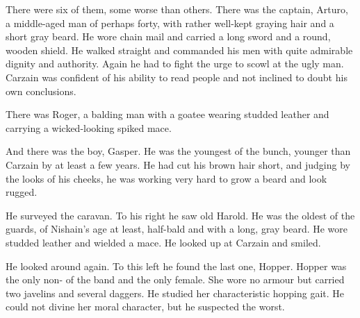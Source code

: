 There were six of them, some worse than others. 
There was the captain, Arturo, a middle-aged man of perhaps forty, with rather well-kept graying hair and a short gray beard. 
He wore chain mail and carried a long sword and a round, wooden shield. 
He walked straight and commanded his men with quite admirable dignity and authority. 
Again he had to fight the urge to scowl at the ugly man. 
Carzain was confident of his ability to read people and not inclined to doubt his own conclusions. 

There was Roger, a balding man with a goatee wearing studded leather and carrying a wicked-looking spiked mace. 

And there was the boy, Gasper. 
He was the youngest of the bunch, younger than Carzain by at least a few years. 
He had cut his brown hair short, and judging by the looks of his cheeks, he was working very hard to grow a beard and look rugged. 

He surveyed the caravan. 
To his right he saw old Harold. He was the oldest of the guards, of Nishain's age at least, half-bald and with a long, gray beard. He wore studded leather and wielded a mace. He looked up at Carzain and smiled.  

He looked around again. 
To this left he found the last one, Hopper. 
Hopper was the only non- of the band and the only female. She wore no armour but carried two javelins and several daggers. He studied her characteristic hopping gait. 
He could not divine her moral character, but he suspected the worst. 




